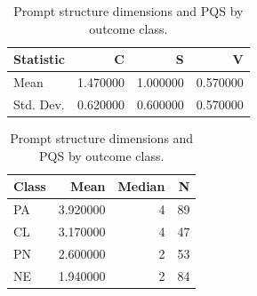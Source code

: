 \begin{table}[t]
\centering
\begin{minipage}{0.45\linewidth}
\centering
\begin{tabular}{lrrr}
\toprule
Statistic & C & S & V \\
\midrule
Mean & 1.470000 & 1.000000 & 0.570000 \\
Std. Dev. & 0.620000 & 0.600000 & 0.570000 \\
\bottomrule
\end{tabular}

\vspace{-0.75em}
\caption*{(a) Prompt structure (C, S, V)}
\end{minipage}
\hfill
\begin{minipage}{0.45\linewidth}
\centering
\begin{tabular}{lrrr}
\toprule
Class & Mean & Median & N \\
\midrule
PA & 3.920000 & 4 & 89 \\
CL & 3.170000 & 4 & 47 \\
PN & 2.600000 & 2 & 53 \\
NE & 1.940000 & 2 & 84 \\
\bottomrule
\end{tabular}

\vspace{-0.75em}
\caption*{(b) PQS by outcome class}
\end{minipage}
\caption{Prompt structure dimensions and PQS by outcome class.}
\label{tab:prompt-structure-pqs}
\end{table}
